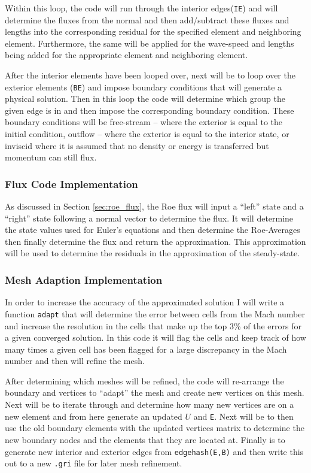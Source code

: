 Within this loop, the code will run through the interior edges({\texttt{IE}}) and will determine the fluxes from the normal and then add/subtract these fluxes and lengths into the corresponding residual for the specified element and neighboring element. Furthermore, the same will be applied for the wave-speed and lengths being added for the appropriate element and neighboring element.

After the interior elements have been looped over, next will be to loop over the exterior elements ({\texttt{BE}}) and impose boundary conditions that will generate a physical solution. Then in this loop the code will determine which group the given edge is in and then impose the corresponding boundary condition. These boundary conditions will be free-stream -- where the exterior is equal to the initial condition, outflow -- where the exterior is equal to the interior state, or inviscid where it is assumed that no density or energy is transferred but momentum can still flux.

\pagebreak
\subsubsection{Flux Code Implementation}
As discussed in Section \ref{sec:roe_flux}, the Roe flux will input a ``left'' state and a ``right'' state following a normal vector to determine the flux. It will determine the state values used for Euler's equations and then determine the Roe-Averages then finally determine the flux and return the approximation. This approximation will be used to determine the residuals in the approximation of the steady-state.


\subsubsection{Mesh Adaption Implementation}
In order to increase the accuracy of the approximated solution I will write a function {\texttt{adapt}} that will determine the error between cells from the Mach number and increase the resolution in the cells that make up the top 3\% of the errors for a given converged solution. In this code it will flag the cells and keep track of how many times a given cell has been flagged for a large discrepancy in the Mach number and then will refine the mesh.

After determining which meshes will be refined, the code will re-arrange the boundary and vertices to ``adapt'' the mesh and create new vertices on this mesh. Next will be to iterate through and determine how many new vertices are on a new element and from here generate an updated $U$ and {\texttt{E}}. Next will be to then use the old boundary elements with the updated vertices matrix to determine the new boundary nodes and the elements that they are located at. Finally is to generate new interior and exterior edges from {\texttt{edgehash(E,B)}} and then write this out to a new {\texttt{.gri}} file for later mesh refinement.\cite{notes:CCW_princeton}

